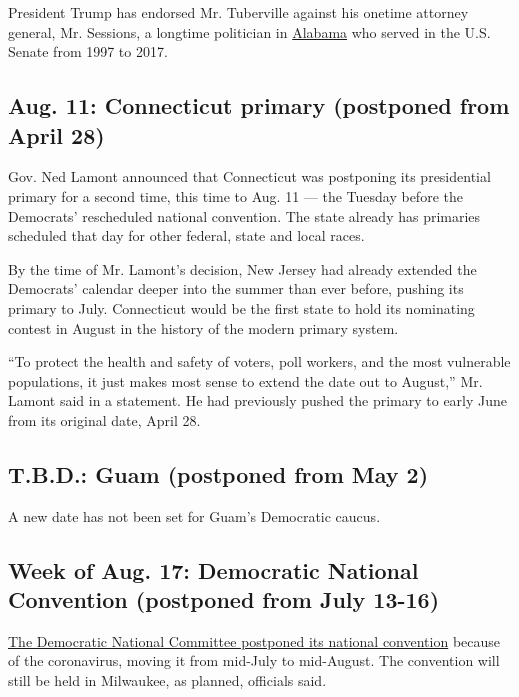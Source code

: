 President Trump has endorsed Mr. Tuberville against his onetime attorney
general, Mr. Sessions, a longtime politician in
\href{https://www.nytimes.com/2020/07/02/us/supreme-court-alabama-voting-restrictions.html}{Alabama}
who served in the U.S. Senate from 1997 to 2017.

\hypertarget{aug-11-connecticut-primary-postponed-from-april-28}{%
\subsection{Aug. 11: Connecticut primary (postponed from April
28)}\label{aug-11-connecticut-primary-postponed-from-april-28}}

Gov. Ned Lamont announced that Connecticut was postponing its
presidential primary for a second time, this time to Aug. 11 --- the
Tuesday before the Democrats' rescheduled national convention. The state
already has primaries scheduled that day for other federal, state and
local races.

By the time of Mr. Lamont's decision, New Jersey had already extended
the Democrats' calendar deeper into the summer than ever before, pushing
its primary to July. Connecticut would be the first state to hold its
nominating contest in August in the history of the modern primary
system.

``To protect the health and safety of voters, poll workers, and the most
vulnerable populations, it just makes most sense to extend the date out
to August,'' Mr. Lamont said in a statement. He had previously pushed
the primary to early June from its original date, April 28.

\hypertarget{tbd-guam-postponed-from-may-2}{%
\subsection{T.B.D.: Guam (postponed from May
2)}\label{tbd-guam-postponed-from-may-2}}

A new date has not been set for Guam's Democratic caucus.

\hypertarget{week-of-aug-17-democratic-national-convention-postponed-from-july-13-16}{%
\subsection{Week of Aug. 17: Democratic National Convention (postponed
from July
13-16)}\label{week-of-aug-17-democratic-national-convention-postponed-from-july-13-16}}

\href{https://www.nytimes.com/2020/04/02/us/politics/milwaukee-democratic-convention-delayed.html}{The
Democratic National Committee postponed its national convention} because
of the coronavirus, moving it from mid-July to mid-August. The
convention will still be held in Milwaukee, as planned, officials said.

